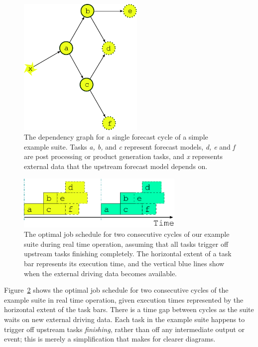\documentclass[11pt,a4paper]{article}
\begin{document}
\begin{figure}
    \begin{center}
        \includegraphics[width=6cm]{inkscape-svg/dep-one-cycle} 
    \end{center}
    \caption[Single cycle dependency graph for a simple suite]{\small
    The dependency graph for a single forecast cycle of a simple example
    suite. Tasks {\em a, b,} and {\em c} represent forecast models,
    {\em d, e} and {\em f} are post processing or product generation
    tasks, and {\em x} represents external data that the upstream
    forecast model depends on.}
    \label{fig-dep-one} 
\end{figure} 

\begin{figure}
    \begin{center}
        \includegraphics[width=8cm]{inkscape-svg/timeline-one}
    \end{center}
    \caption[Single cycle job schedules for real time operation]{\small
    The optimal job schedule for two consecutive cycles of our example
    suite during real time operation, assuming that all tasks trigger 
    off upstream tasks finishing completely. The horizontal extent of
    a task bar represents its execution time, and the vertical blue
    lines show when the external driving data becomes available.}
    \label{fig-time-one}
\end{figure}

Figure~\ref{fig-time-one} shows the optimal job schedule for two
consecutive cycles of the example suite in real time operation, given
execution times represented by the horizontal extent of the task bars.
There is a time gap between cycles as the suite waits on new external
driving data.  Each task in the example suite happens to trigger off
upstream tasks {\em finishing}, rather than off any intermediate output
or event; this is merely a simplification that makes for clearer
diagrams.
\end{document}
